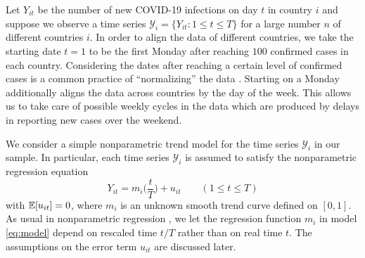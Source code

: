 \documentclass[a4paper,12pt]{article}
\numberwithin{equation}{section}
\begin{document}
Let $Y_{it}$ be the number of new COVID-19 infections on day $t$ in country $i$ and suppose we observe a time series $\mathcal{Y}_i = \{ Y_{it}: 1 \le t \le T \}$ for a large number $n$ of different countries $i$. In order to align the data of different countries, we take the starting date $t=1$ to be the first Monday after reaching $100$ confirmed cases in each country. Considering the dates after reaching a certain level of confirmed cases is a common practice of ``normalizing'' the data \citep[see e.g.][]{Cohen2020}. Starting on a Monday additionally aligns the data across countries by the day of the week. This allows us to take care of possible weekly cycles in the data which are produced by delays in reporting new cases over the weekend. 


We consider a simple nonparametric trend model for the time series $\mathcal{Y}_i$ in our sample. In particular, each time series $\mathcal{Y}_i$ is assumed to satisfy the nonparametric regression equation
\begin{equation}\label{eq:model}
Y_{it} = m_i\Big(\frac{t}{T}\Big) + u_{it} \qquad (1 \le t \le T) 
\end{equation}
with $\mathbb{E}[u_{it}]= 0$, where $m_i$ is an unknown smooth trend curve defined on $[0,1]$. As usual in nonparametric regression \citep[see e.g.][]{Robinson1989}, we let the regression function $m_i$ in model \eqref{eq:model} depend on rescaled time $t/T$ rather than on real time $t$. The assumptions on the error term $u_{it}$ are discussed later. 
\end{document}
